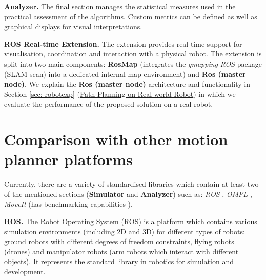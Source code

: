 \textbf{Analyzer.} The final section manages the statistical measures used in the practical assessment of the algorithms. Custom metrics can be defined as well as graphical displays for visual interpretations.



\textbf{ROS Real-time Extension.} The extension provides real-time support for visualisation, coordination and interaction with a physical robot. The extension is split into two main components: \textbf{RosMap} (integrates the \textit{gmapping} \textit{ROS} package (SLAM scan) into a dedicated internal map environment) and \textbf{Ros (master node)}. We explain the \textbf{Ros (master node)} architecture and functionality in Section \ref{sec: robotexp} (\hyperref[sec: robotexp]{Path Planning on Real-world Robot}) in which we evaluate the performance of the proposed solution on a real robot.

\section{Comparison with other motion planner platforms}

Currently, there are a variety of standardised libraries which contain at least two of the mentioned sections (\textbf{Simulator} and \textbf{Analyzer}) such as: \textit{ROS} \cite{Quigley09}, \textit{OMPL} \cite{sucan2012the_open_motion_planning_library}, \textit{MoveIt} \cite{moveit} (has benchmarking capabilities \cite{moll2015benchmarking}).

\textbf{ROS.} The Robot Operating System (ROS) is a platform which contains various simulation environments (including 2D and 3D) for different types of robots: ground robots with different degrees of freedom constraints, flying robots (drones) and manipulator robots (arm robots which interact with different objects). It represents the standard library in robotics for simulation and development.

